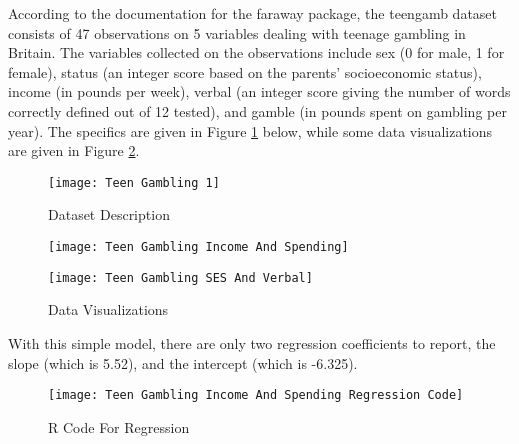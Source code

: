 \documentclass[12pt, letterpaper]{article}
\theoremstyle{definition}
\numberwithin{equation}{section}
\newcommand{\+}[1]{+_{\scalebox{.375}{#1}}}
\newcommand{\1}{\mathbbm{1}}
\begin{document}
\vspace{\baselineskip}
\noindent\textbf{}
\vspace{\baselineskip}


According to the documentation for the faraway package, the teengamb dataset consists of 47 observations on 5 variables dealing with teenage gambling in Britain. The variables collected on the observations include sex (0 for male, 1 for female), status (an integer score based on the parents' socioeconomic status), income (in pounds per week), verbal (an integer score giving the number of words correctly defined out of 12 tested), and gamble (in pounds spent on gambling per year). The specifics are given in Figure \ref{fig.description} below, while some data visualizations are given in Figure \ref{fig.datavis}.

\begin{figure}[H]
	\centering
	\texttt{[image: Teen Gambling 1]}
	\caption{Dataset Description}
	\label{fig.description}
\end{figure}
\vspace{-0.5cm}

\begin{figure}[H]
	\centering
	\texttt{[image: Teen Gambling Income And Spending]}
\end{figure}
\vspace{-0.5cm}

\begin{figure}[H]
	\centering
	\texttt{[image: Teen Gambling SES And Verbal]}
	\caption{Data Visualizations}
	\label{fig.datavis}
\end{figure}

\vspace{\baselineskip}
\noindent\textbf{}
\vspace{\baselineskip}

With this simple model, there are only two regression coefficients to report, the slope (which is 5.52), and the intercept (which is -6.325).

\begin{figure}[H]
	\centering
	\texttt{[image: Teen Gambling Income And Spending Regression Code]}
	\caption{R Code For Regression}
\end{figure}
\vspace{-0.5cm}
\end{document}
